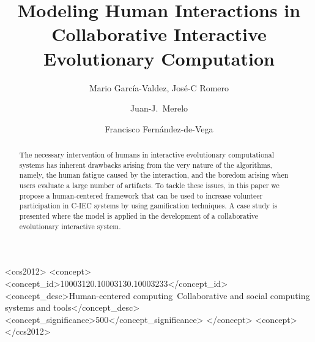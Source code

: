 \documentclass[sigconf]{acmart}
\begin{document}
\title{Modeling Human Interactions in Collaborative Interactive 
 Evolutionary Computation}

\author{Mario Garc\'ia-Valdez, Jos\'e-C Romero}


\author{Juan-J.~Merelo}

\author{Francisco Fern\'andez-de-Vega}


\begin{abstract} The necessary intervention of humans in interactive
evolutionary computational systems has inherent drawbacks arising from the
very nature of the algorithms, namely, the human fatigue caused by the
interaction, and the boredom arising when users evaluate a large number of
artifacts. To tackle these issues, in this paper we propose a human-centered
framework that can be used to  increase volunteer participation in C-IEC 
systems by using gamification techniques. A case study is
presented where the model is applied in the development of a collaborative
evolutionary interactive system.
\end{abstract}

%
%
\begin{CCSXML}
<ccs2012>
<concept>
<concept_id>10003120.10003130.10003233</concept_id>
<concept_desc>Human-centered computing~Collaborative and social computing systems and tools</concept_desc>
<concept_significance>500</concept_significance>
</concept>
<concept>
</ccs2012>
\end{CCSXML}



\maketitle




 
\end{document}
